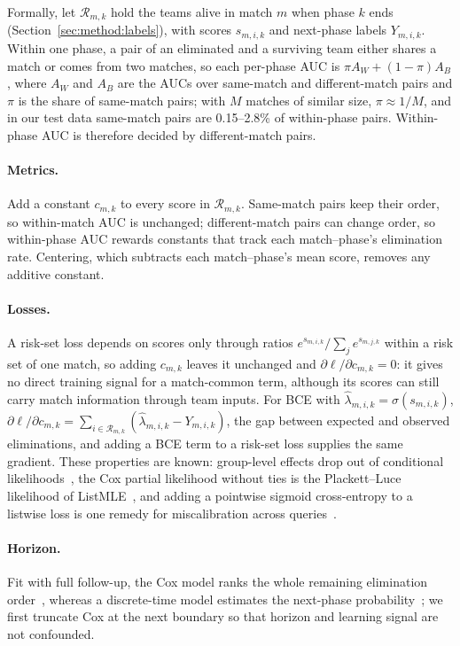 \documentclass[sigconf,anonymous]{acmart}
\begin{document}
Formally, let $\mathcal{R}_{m,k}$ hold the teams alive in match $m$ when phase $k$ ends (Section~\ref{sec:method:labels}), with scores $s_{m,i,k}$ and next-phase labels $Y_{m,i,k}$. Within one phase, a pair of an eliminated and a surviving team either shares a match or comes from two matches, so each per-phase AUC is $\pi A_W+(1-\pi)A_B$, where $A_W$ and $A_B$ are the AUCs over same-match and different-match pairs and $\pi$ is the share of same-match pairs; with $M$ matches of similar size, $\pi\approx1/M$, and in our test data same-match pairs are 0.15--2.8\% of within-phase pairs. Within-phase AUC is therefore decided by different-match pairs.

\paragraph{Metrics.}
Add a constant $c_{m,k}$ to every score in $\mathcal{R}_{m,k}$. Same-match pairs keep their order, so within-match AUC is unchanged; different-match pairs can change order, so within-phase AUC rewards constants that track each match--phase's elimination rate. Centering, which subtracts each match--phase's mean score, removes any additive constant.

\paragraph{Losses.}
A risk-set loss depends on scores only through ratios $e^{s_{m,i,k}}/\sum_{j}e^{s_{m,j,k}}$ within a risk set of one match, so adding $c_{m,k}$ leaves it unchanged and $\partial\ell/\partial c_{m,k}=0$: it gives no direct training signal for a match-common term, although its scores can still carry match information through team inputs. For BCE with $\hat\lambda_{m,i,k}=\sigma(s_{m,i,k})$, $\partial\ell/\partial c_{m,k}=\sum_{i\in\mathcal{R}_{m,k}}(\hat\lambda_{m,i,k}-Y_{m,i,k})$, the gap between expected and observed eliminations, and adding a BCE term to a risk-set loss supplies the same gradient. These properties are known: group-level effects drop out of conditional likelihoods~\cite{Chamberlain80}, the Cox partial likelihood without ties is the Plackett--Luce likelihood of ListMLE~\cite{Xia08}, and adding a pointwise sigmoid cross-entropy to a listwise loss is one remedy for miscalibration across queries~\cite{Bai23}.

\paragraph{Horizon.}
Fit with full follow-up, the Cox model ranks the whole remaining elimination order~\cite{Cox72}, whereas a discrete-time model estimates the next-phase probability~\cite{SingerWillett93,Gensheimer19}; we first truncate Cox at the next boundary so that horizon and learning signal are not confounded.
\end{document}
